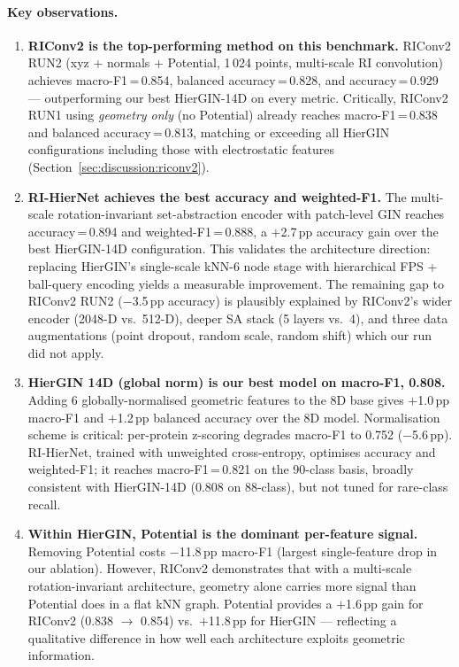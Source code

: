 \paragraph{Key observations.}
\begin{enumerate}

  \item \textbf{RIConv2 is the top-performing method on this benchmark.}
        RIConv2 RUN2 (xyz + normals + Potential, 1\,024 points, multi-scale RI
        convolution) achieves macro-F1\,=\,0.854, balanced accuracy\,=\,0.828,
        and accuracy\,=\,0.929 --- outperforming our best HierGIN-14D on every
        metric.
        Critically, RIConv2 RUN1 using \emph{geometry only} (no Potential)
        already reaches macro-F1\,=\,0.838 and balanced accuracy\,=\,0.813,
        matching or exceeding all HierGIN configurations including those with
        electrostatic features (Section~\ref{sec:discussion:riconv2}).

  \item \textbf{RI-HierNet achieves the best accuracy and weighted-F1.}
        The multi-scale rotation-invariant set-abstraction encoder with patch-level
        GIN reaches accuracy\,=\,0.894 and weighted-F1\,=\,0.888, a $+$2.7\,pp
        accuracy gain over the best HierGIN-14D configuration.
        This validates the architecture direction: replacing HierGIN's single-scale
        kNN-6 node stage with hierarchical FPS + ball-query encoding yields a
        measurable improvement.
        The remaining gap to RIConv2 RUN2 ($-$3.5\,pp accuracy) is plausibly
        explained by RIConv2's wider encoder (2048-D vs.\ 512-D), deeper SA stack
        (5 layers vs.\ 4), and three data augmentations (point dropout, random scale,
        random shift) which our run did not apply.

  \item \textbf{HierGIN 14D (global norm) is our best model on macro-F1, 0.808.}
        Adding 6 globally-normalised geometric features to the 8D base gives
        $+$1.0\,pp macro-F1 and $+$1.2\,pp balanced accuracy over the 8D
        model.
        Normalisation scheme is critical: per-protein z-scoring degrades
        macro-F1 to 0.752 ($-$5.6\,pp).
        RI-HierNet, trained with unweighted cross-entropy, optimises accuracy and
        weighted-F1; it reaches macro-F1\,=\,0.821 on the 90-class basis, broadly
        consistent with HierGIN-14D (0.808 on 88-class), but not tuned for
        rare-class recall.

  \item \textbf{Within HierGIN, Potential is the dominant per-feature signal.}
        Removing Potential costs $-$11.8\,pp macro-F1 (largest single-feature
        drop in our ablation).
        However, RIConv2 demonstrates that with a multi-scale rotation-invariant
        architecture, geometry alone carries more signal than Potential does in
        a flat kNN graph.
        Potential provides a $+$1.6\,pp gain for RIConv2 (0.838 $\to$ 0.854)
        vs.\ $+$11.8\,pp for HierGIN --- reflecting a qualitative difference
        in how well each architecture exploits geometric information.


\end{enumerate}
